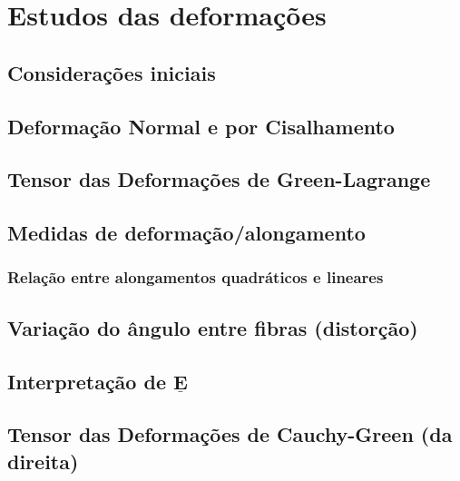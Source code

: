 \section{Estudos das deformações}
	
	\subsection{Considerações iniciais}
		
	
	\subsection{Deformação Normal e por Cisalhamento}
		
	
	\subsection{Tensor das Deformações de Green-Lagrange}
		
	
	\subsection{Medidas de deformação/alongamento}
		

		\subsubsection{Relação entre alongamentos quadráticos e lineares}
			
	
	\subsection{Variação do ângulo entre fibras (distorção)}
		
	
	\subsection{Interpretação de $\underline{\mathbf{E}}$}
		
	
	\subsection{Tensor das Deformações de Cauchy-Green (da direita)}
		
	
